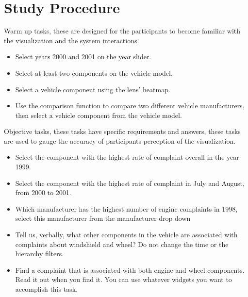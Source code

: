 \appendix


\chapter{Study Procedure}

\noindent 
Warm up tasks, these are designed for the participants to become
familiar with the visualization and the system interactions.

\begin{itemize}[noitemsep]
  \item Select years 2000 and 2001 on the year slider.
  \item Select at least two components on the \threed vehicle model.
  \item Select a vehicle component using the lens' heatmap.
  \item Use the comparison function to compare two different vehicle
  manufacturers, then select a vehicle component from the \threed vehicle model.
\end{itemize}



\noindent 
Objective tasks, these tasks have specific requirements and answers, these tasks
are used to gauge the accuracy of participants perception of the \threed
visualization.

\begin{itemize}[noitemsep]
  \item Select the component with the highest rate of complaint overall in the
  year 1999.
  \item Select the component with the highest rate of complaint in July and
  August, from 2000 to 2001.
  \item Which manufacturer has the highest number of engine complaints in 1998,
  select this manufacturer from the manufacturer drop down
  \item Tell us, verbally, what other components in the vehicle are associated
  with complaints about windshield and wheel? Do not change the time or the
  hierarchy filters.
  \item Find a complaint that is associated with both engine and wheel
  components. Read it out when you find it. You can use whatever widgets  you
  want to accomplish this task.
\end{itemize}


